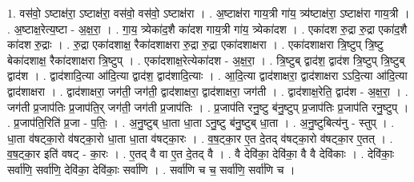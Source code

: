 \documentclass[17pt]{extarticle}
\begin{document}
1. वस॑वो॒ ऽष्टाक्ष॑रा॒ ऽष्टाक्ष॑रा॒ वस॑वो॒ वस॑वो॒ ऽष्टाक्ष॑रा । . अ॒ष्टाक्ष॑रा गाय॒त्री गा॑य॒ त्र्य॑ष्टाक्ष॑रा॒ ऽष्टाक्ष॑रा गाय॒त्री । . अ॒ष्टाक्ष॒रेत्य॒ष्टा - अ॒क्ष॒रा॒ । . गा॒य॒ त्र्येका॑द॒शै का॑दश गाय॒त्री गा॑य॒ त्र्येका॑दश । . एका॑दश रु॒द्रा रु॒द्रा एका॑द॒शै का॑दश रु॒द्राः । . रु॒द्रा एका॑दशाक्ष॒ रैका॑दशाक्षरा रु॒द्रा रु॒द्रा एका॑दशाक्षरा । . एका॑दशाक्षरा त्रि॒ष्टुप् त्रि॒ष्टु बेका॑दशाक्ष॒ रैका॑दशाक्षरा त्रि॒ष्टुप् । . एका॑दशाक्ष॒रेत्येका॑दश - अ॒क्ष॒रा॒ । . त्रि॒ष्टुब् द्वाद॑श॒ द्वाद॑श त्रि॒ष्टुप् त्रि॒ष्टुब् द्वाद॑श । . द्वाद॑शादि॒त्या आ॑दि॒त्या द्वाद॑श॒ द्वाद॑शादि॒त्याः । . आ॒दि॒त्या द्वाद॑शाक्षरा॒ द्वाद॑शाक्षरा ऽऽदि॒त्या आ॑दि॒त्या द्वाद॑शाक्षरा । . द्वाद॑शाक्षरा॒ जग॑ती॒ जग॑ती॒ द्वाद॑शाक्षरा॒ द्वाद॑शाक्षरा॒ जग॑ती । . द्वाद॑शाक्ष॒रेति॒ द्वाद॑श - अ॒क्ष॒रा॒ । . जग॑ती प्र॒जाप॑तिः प्र॒जाप॑ति॒र् जग॑ती॒ जग॑ती प्र॒जाप॑तिः । . प्र॒जाप॑ति रनु॒ष्टु ब॑नु॒ष्टुप् प्र॒जाप॑तिः प्र॒जाप॑ति रनु॒ष्टुप् । . प्र॒जाप॑ति॒रिति॑ प्र॒जा - प॒तिः॒ । . अ॒नु॒ष्टुब् धा॒ता धा॒ता ऽनु॒ष्टु ब॑नु॒ष्टुब् धा॒ता । . अ॒नु॒ष्टुबित्य॑नु - स्तुप् । . धा॒ता व॑षट्का॒रो व॑षट्का॒रो धा॒ता धा॒ता व॑षट्का॒रः । . व॒ष॒ट्का॒र ए॒त दे॒तद् व॑षट्का॒रो व॑षट्का॒र ए॒तत् । . व॒ष॒ट्का॒र इति॑ वषट् - का॒रः । . ए॒तद् वै वा ए॒त दे॒तद् वै । . वै देवि॑का॒ देवि॑का॒ वै वै देवि॑काः । . देवि॑काः॒ सर्वा॑णि॒ सर्वा॑णि॒ देवि॑का॒ देवि॑काः॒ सर्वा॑णि । . सर्वा॑णि च च॒ सर्वा॑णि॒ सर्वा॑णि च । \newline
\end{document}
